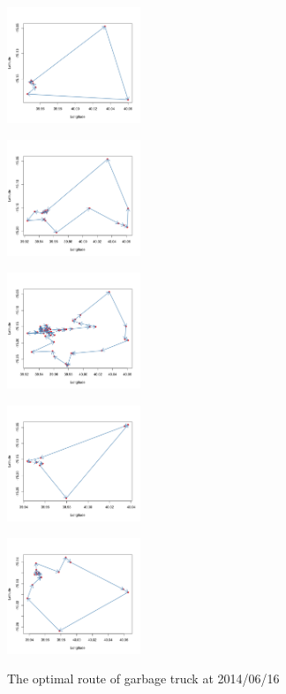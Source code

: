 \documentclass[conference,compsoc]{IEEEtran}
\begin{document}
\begin{figure}
	\centering
	\parbox{5cm}{
		\includegraphics[width=4cm]{Cluster1}
		\label{fig1a}}
	\begin{minipage}{3cm}
		\includegraphics[width=4cm]{Cluster2}
		\label{fig1b}
	\end{minipage}

	\parbox{5cm}{
	\includegraphics[width=4cm]{Cluster3}
	\label{fig1a}}
\begin{minipage}{3cm}
	\includegraphics[width=4cm]{Cluster4}
	\label{fig1b}
\end{minipage}

\begin{minipage}{3cm}
	\includegraphics[width=4cm]{Cluster5}
	
	\label{fig1b}
\end{minipage}
	\caption{The optimal route of garbage truck at 2014/06/16}
	\label{fig5}

\end{figure}
\end{document}

